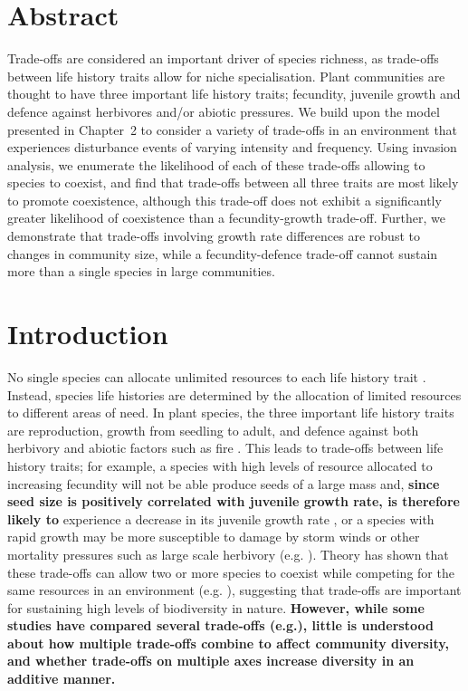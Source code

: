 \newpage
{}
\vspace*{\fill}
\section*{Abstract}
Trade-offs are considered an important driver of species richness, as trade-offs between life history traits allow for niche specialisation. Plant communities are thought to have three important life history traits; fecundity, juvenile growth and defence against herbivores and/or abiotic pressures. We build upon the model presented in Chapter~2 to consider a variety of trade-offs in an environment that experiences disturbance events of varying intensity and frequency. Using invasion analysis, we enumerate the likelihood of each of these trade-offs allowing to species to coexist, and find that trade-offs between all three traits are most likely to promote coexistence, although this trade-off does not exhibit a significantly greater likelihood of coexistence than a fecundity-growth trade-off. Further, we demonstrate that trade-offs involving growth rate differences are robust to changes in community size, while a fecundity-defence trade-off cannot sustain more than a single species in large communities. 
\vspace*{\fill}
\newpage

\section{Introduction}
No single species can allocate unlimited resources to each life history trait \cite{law1979optimal,tilman1982resource}. Instead, species life histories are determined by the allocation of limited resources to different areas of need. In plant species, the three important life history traits are reproduction, growth from seedling to adult, and defence against both herbivory and abiotic factors such as fire \cite{bazzaz1987allocating}. This leads to trade-offs between life history traits; for example, a species with high levels of resource allocated to increasing fecundity will not be able produce seeds of a large mass \cite{turnbull1999seed} and, \textbf{since seed size is positively correlated with juvenile growth rate, is therefore likely to} experience a decrease in its juvenile growth rate \cite{gross1984effects}, or a species with rapid growth may be more susceptible to damage by storm winds or other mortality pressures such as large scale herbivory (e.g. \cite{wright2010functional,fine2006growth}). Theory has shown that these trade-offs can allow two or more species to coexist while competing for  the same resources in an environment (e.g. \cite{kisdi2003coexistence,levins1971regional,bonsall2004life}), suggesting that trade-offs are important for sustaining high levels of biodiversity in nature. \textbf{However, while some studies have compared several trade-offs (e.g.\cite{tilman1990constraints,grime1977evidence}), little is understood about how multiple trade-offs combine to affect community diversity, and whether trade-offs on multiple axes increase diversity in an additive manner.}


